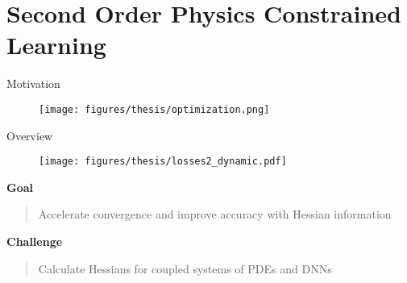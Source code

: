 \documentclass[usenames,dvipsnames]{beamer}
\begin{document}
\section{Second Order Physics Constrained Learning}

\begin{frame}{Motivation}


	
\begin{figure}
	\centering
	\texttt{[image: figures/thesis/optimization.png]}
\end{figure}




\end{frame}

\begin{frame}{Overview}
		\begin{figure}[htbp]
		\centering
		\texttt{[image: figures/thesis/losses2\_dynamic.pdf]}
	\end{figure}
	
	\vspace{-0.4cm} 
	
	\textbf{Goal}
	
	\vspace{0.2cm} 
	
\begin{quote}
	Accelerate convergence and improve accuracy with Hessian information
\end{quote}

\textbf{Challenge}

\vspace{0.2cm} 

\begin{quote}
Calculate Hessians for coupled systems of PDEs and DNNs
\end{quote}

\end{frame}
\end{document}
